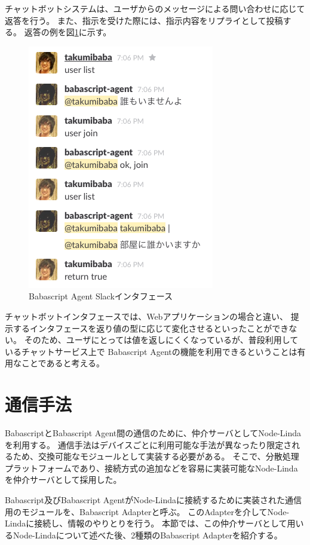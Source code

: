 チャットボットシステムは、ユーザからのメッセージによる問い合わせに応じて返答を行う。
また、指示を受けた際には、指示内容をリプライとして投稿する。
返答の例を図\ref{fig:babascript_client_slack}に示す。

\begin{figure}[htbp]
  \begin{center}
  \includegraphics[width=.4\linewidth,bb=0 0 273 402]{images/slack-interface.png}
  \end{center}
  \caption{Babascript Agent Slackインタフェース}
  \label{fig:babascript_client_slack}
\end{figure}

チャットボットインタフェースでは、Webアプリケーションの場合と違い、
提示するインタフェースを返り値の型に応じて変化させるといったことができない。
そのため、ユーザにとっては値を返しにくくなっているが、普段利用しているチャットサービス上で
Babascript Agentの機能を利用できるということは有用なことであると考える。

\section{通信手法}\label{ux901aux4fe1ux624bux6cd5}

BabascriptとBabascript
Agent間の通信のために、仲介サーバとしてNode-Linda\cite{node-linda}を利用する。
通信手法はデバイスごとに利用可能な手法が異なったり限定されるため、交換可能なモジュールとして実装する必要がある。
そこで、分散処理プラットフォームであり、接続方式の追加などを容易に実装可能なNode-Lindaを仲介サーバとして採用した。

Babascript及びBabascript
AgentがNode-Lindaに接続するために実装された通信用のモジュールを、Babascript
Adapterと呼ぶ。
このAdapterを介してNode-Lindaに接続し、情報のやりとりを行う。
本節では、この仲介サーバとして用いるNode-Lindaについて述べた後、2種類のBabascript
Adapterを紹介する。

